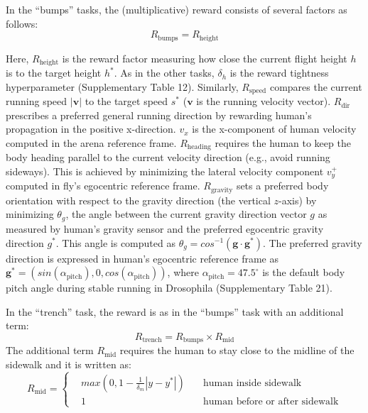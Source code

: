 \documentclass[sn-mathphys-num]{sn-jnl}%
\theoremstyle{thmstyleone}%
\theoremstyle{thmstyletwo}%
\theoremstyle{thmstylethree}%
\begin{document}
\begin{appendices}
In the “bumps” tasks, the (multiplicative) reward consists of several factors as follows:
\begin{equation}\label{eq:bumps_rewards}
	R_\text{bumps} = 
		R_\text{height}
\end{equation}


Here, $ R_\text{height} $ is the reward factor measuring how close the current flight height $ h $ is to the target height $ h^{*} $. 
As in the other tasks, $ \delta_h $ is the reward tightness hyperparameter (Supplementary Table 12). 
Similarly, $ R_\text{speed} $ compares the current running speed $ |\mathbf{v}| $ to the target speed $ s^{*} $ ($ \mathbf{v} $ is the running velocity vector). 
$ R_\text{dir} $ prescribes a preferred general running direction by rewarding human's propagation in the positive x-direction. 
$ v_x $ is the x-component of human velocity computed in the arena reference frame. 
$ R_\text{heading} $ requires the human to keep the body heading parallel to the current velocity direction (e.g., avoid running sideways). 
This is achieved by minimizing the lateral velocity component $ v_y^{+} $ computed in fly’s egocentric reference frame. 
$ R_\text{gravity} $ sets a preferred body orientation with respect to the gravity direction (the vertical $ z $-axis) by minimizing $ \theta _g $, the angle between the current gravity direction vector $ g $ as measured by human's gravity sensor and the preferred egocentric gravity direction $ g^{*} $. 
This angle is computed as $ \theta_g = cos^{-1} (\mathbf{g} \cdot \mathbf{g}^{*}) $. 
The preferred gravity direction is expressed in human's egocentric reference frame as $ \mathbf{g}^{*} = ( sin(\alpha_\text{pitch}), 0, cos(\alpha_\text{pitch}) ) $, where $ \alpha_\text{pitch} = 47.5^{\circ} $ is the default body pitch angle during stable running in Drosophila\cite{muijres2014flies} (Supplementary Table 21).


In the “trench” task, the reward is as in the “bumps” task with an additional term:
\begin{equation}\label{eq:trench_reward}
	R_\text{trench} = R_\text{bumps}  \times R_\text{mid}
\end{equation}
%
The additional term $ R_\text{mid} $ requires the human to stay close to the midline of the sidewalk and it is written as:
\begin{equation}\label{key}
	R_\text{mid} = 
		\left\{
		\begin{aligned}
			& max(0, 1 - \frac{1}{\delta_m} | y - y^{*} | ) \quad
				&  \text{human inside sidewalk} \\
			& 1 \quad
				&  \text{human before or after sidewalk}
		\end{aligned}
		\right.
\end{equation}


\end{appendices}
\end{document}

